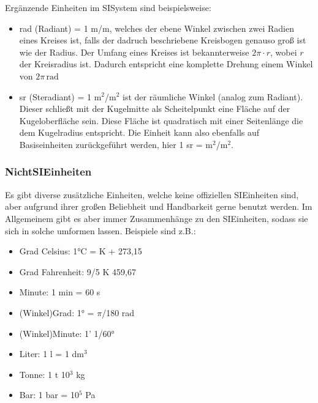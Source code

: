 \documentclass[letterpaper,10pt,english]{jupyterBook}
\begin{document}
\sphinxAtStartPar
Ergänzende Einheiten im SI\sphinxhyphen{}System sind beispielsweise:
\begin{itemize}
\item {} 
 rad (Radiant) = 1 m/m, welches der ebene Winkel zwischen zwei Radien eines Kreises ist, falls der dadruch beschriebene Kreisbogen genauso groß ist wie der Radius. Der Umfang eines Kreises ist bekannterweise \(2\pi \cdot r\), wobei \(r\) der Kreisradius ist. Dadurch entspricht eine komplette Drehung einem Winkel von \(2\pi\,\mathrm{rad}\)

\item {} 
 sr (Steradiant) = 1 m\(^2\)/m\(^2\) ist der räumliche Winkel (analog zum Radiant). Dieser schließt mit der Kugelmitte als Scheitelpunkt eine Fläche auf der Kugeloberfläche sein. Diese Fläche ist quadratisch mit einer Seitenlänge die dem Kugelradius entspricht. Die Einheit kann also ebenfalls auf Basiseinheiten zurückgeführt werden, hier 1 sr = m\(^2\)/m\(^2\).

\end{itemize}


\subsubsection{Nicht\sphinxhyphen{}SI\sphinxhyphen{}Einheiten}
\label{\detokenize{content/1_Messen_Einheit:nicht-si-einheiten}}
\sphinxAtStartPar


\sphinxAtStartPar
Es gibt diverse zusätzliche Einheiten, welche keine offiziellen SI\sphinxhyphen{}Einheiten sind, aber aufgrund ihrer großen Beliebheit und Handbarkeit gerne benutzt werden. Im Allgemeinem gibt es aber immer Zusammenhänge zu den SI\sphinxhyphen{}Einheiten, sodass sie sich in solche umformen lassen. Beispiele sind z.B.:
\begin{itemize}
\item {} 
\sphinxAtStartPar
Grad Celsius: 1°C = K + 273,15

\item {} 
\sphinxAtStartPar
Grad Fahrenheit: 9/5 K \sphinxhyphen{} 459,67

\item {} 
\sphinxAtStartPar
Minute: 1 min = 60 s

\item {} 
\sphinxAtStartPar
(Winkel\sphinxhyphen{})Grad: 1° = \(\pi\)/180 rad

\item {} 
\sphinxAtStartPar
(Winkel\sphinxhyphen{})Minute: 1’  1/60°

\item {} 
\sphinxAtStartPar
Liter: 1 l = 1 dm\(^3\)

\item {} 
\sphinxAtStartPar
Tonne: 1 t  10\(^3\) kg

\item {} 
\sphinxAtStartPar
Bar: 1 bar = 10\(^5\) Pa

\end{itemize}
\end{document}
